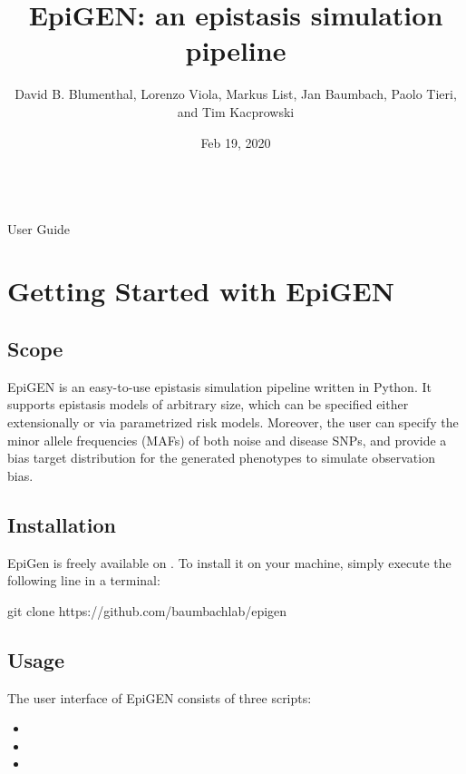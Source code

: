 \documentclass[a4paper,10pt,english]{sphinxhowto}
\title{EpiGEN: an epistasis simulation pipeline}
\date{Feb 19, 2020}
\author{David B. Blumenthal, Lorenzo Viola, Markus List, Jan Baumbach, Paolo Tieri, and Tim Kacprowski}
\begin{document}
\pagestyle{empty}
\makeatletter\py@HeaderFamily\raggedright{\huge\@title}\\[24pt]{\Large User Guide}\\[24pt]{\large\@author}\makeatother\normalfont
\pagestyle{plain}
\sphinxtableofcontents
\pagestyle{normal}
\label{\detokenize{index::doc}}



\section{Getting Started with EpiGEN}
\label{\detokenize{README:getting-started-with-epigen}}\label{\detokenize{README::doc}}

\subsection{Scope}
\label{\detokenize{README:scope}}
EpiGEN is an easy-to-use epistasis simulation pipeline written in Python. It supports epistasis models of arbitrary size, which can be specified either extensionally or via parametrized risk models. Moreover, the user can specify the minor allele frequencies (MAFs) of both noise and disease SNPs, and provide a bias target distribution for the generated phenotypes to simulate observation bias.


\subsection{Installation}
\label{\detokenize{README:installation}}
EpiGen is freely available on . To install it on your machine, simply execute the following line in a terminal:

\begin{sphinxVerbatim}[commandchars=\\\{\}]
git clone https://github.com/baumbachlab/epigen
\end{sphinxVerbatim}


\subsection{Usage}
\label{\detokenize{README:usage}}
The user interface of EpiGEN consists of three scripts:
\begin{itemize}
\item {} 

\item {} 

\item {} 

\end{itemize}
\end{document}
